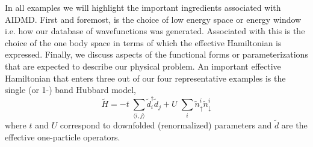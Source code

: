In all examples we will highlight the important ingredients associated with AIDMD. First and foremost, is the choice 
of low energy space or energy window i.e. how our database of wavefunctions was generated. Associated with this is 
the choice of the one body space in terms of which the effective Hamiltonian is expressed. Finally, we discuss 
aspects of the functional forms or parameterizations that are expected to describe our physical 
problem. An important effective Hamiltonian that enters three out of our four representative examples is 
the single (or 1-) band Hubbard model,
\begin{equation}
	\tilde{H} = -t \;\sum_{\langle i,j \rangle} \tilde{d}_i^{\dagger} \tilde{d}_j + U \;\sum_{i} \tilde{n}^{i}_{\uparrow} \tilde{n}^{i}_{\downarrow}
\label{eq:oneband}
\end{equation}
where $t$ and $U$ correspond to downfolded (renormalized) parameters and $\tilde{d}$ are the effective one-particle operators. 

